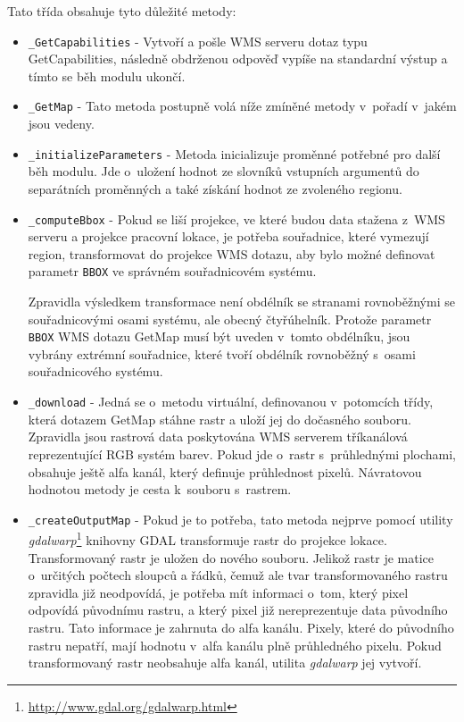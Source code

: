 \documentclass[a4paper,12pt]{article}
\begin{document}
Tato třída obsahuje tyto důležité metody:  
\begin{itemize}
  \item {\tt \_GetCapabilities} - Vytvoří a pošle WMS serveru dotaz typu
    GetCapabilities, následně obdrženou odpověď vypíše na standardní
    výstup a tímto se běh modulu ukončí.
  \item {\tt \_GetMap} - Tato metoda postupně volá níže zmíněné metody
v~pořadí v~jakém jsou vedeny.
  \item {\tt \_initializeParameters} - Metoda inicializuje proměnné potřebné
    pro další běh modulu. Jde o~uložení hodnot ze slovníků vstupních
    argumentů do separátních proměnných a také získání hodnot ze
    zvoleného regionu.
  \item {\tt \_computeBbox} - Pokud se liší projekce, ve které budou data
    stažena z~WMS serveru a projekce pracovní lokace, je potřeba
    souřadnice, které vymezují region, transformovat do projekce WMS
    dotazu, aby bylo možné definovat parametr {\tt BBOX} ve správném
    souřadnicovém systému.

   Zpravidla výsledkem transformace není obdélník se stranami
   rovnoběžnými se souřadnicovými osami systému, ale obecný
   čtyřúhelník. Protože parametr {\tt BBOX} WMS dotazu GetMap musí být
   uveden v~tomto obdélníku, jsou vybrány extrémní souřadnice, které
   tvoří obdélník rovnoběžný s~osami souřadnicového systému.
  \item {\tt \_download} - Jedná se o~metodu virtuální, definovanou
v~potomcích třídy, která dotazem GetMap stáhne rastr a uloží jej do
    dočasného souboru. Zpravidla jsou rastrová data poskytována WMS
    serverem tříkanálová reprezentující RGB systém barev. Pokud jde
o~rastr s~průhlednými plochami, obsahuje ještě alfa kanál, který
    definuje průhlednost pixelů. Návratovou hodnotou metody je cesta
k~souboru s~rastrem.
  \item {\tt \_createOutputMap} - Pokud je to potřeba, tato metoda nejprve
    pomocí utility \emph{gdalwarp}\footnote{\url{http://www.gdal.org/gdalwarp.html}}
     knihovny GDAL transformuje rastr do
    projekce lokace. Transformovaný rastr je uložen do nového souboru.
    Jelikož rastr je matice o~určitých počtech sloupců a řádků, čemuž
    ale tvar transformovaného rastru zpravidla již neodpovídá, je
    potřeba mít informaci o~tom, který pixel odpovídá původnímu rastru,
    a který pixel již nereprezentuje data původního rastru. Tato
    informace je zahrnuta do alfa kanálu. Pixely, které do původního
    rastru nepatří, mají hodnotu v~alfa kanálu plně průhledného pixelu.
    Pokud transformovaný rastr neobsahuje alfa kanál, utilita
    \emph{gdalwarp} jej vytvoří.
\end{itemize}
\end{document}
